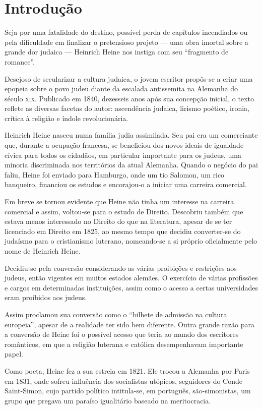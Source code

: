 \documentclass[12pt]{extarticle}
\begin{document}
\tableofcontents

\section{Introdução}

Seja por uma fatalidade do destino, possível perda de capítulos incendiados ou pela dificuldade em finalizar o pretensioso projeto --- uma obra imortal sobre a grande dor judaica --- Heinrich Heine nos instiga com seu ``fragmento de romance''.

Desejoso de secularizar a cultura judaica, o jovem escritor propôs-se a criar uma epopeia sobre o povo judeu diante da escalada antissemita na Alemanha do século \textsc{xix}.
Publicado em 1840, dezesseis anos após sua concepção inicial, o texto reflete as diversas facetas do autor:
ascendência judaica, lirismo poético, ironia, crítica à religião e índole revolucionária.

Heinrich Heine nasceu numa família judia assimilada. Seu pai era um comerciante que, durante a ocupação francesa, se beneficiou dos novos ideais de igualdade cívica para todos os cidadãos, em particular importante para os judeus, uma minoria discriminada nos territórios da atual Alemanha. 
Quando o negócio do pai faliu, Heine foi enviado para Hamburgo, onde um tio Salomon, um rico banqueiro, financiou os estudos e encorajou-o a iniciar uma carreira comercial.

Em breve se tornou evidente que Heine não tinha um interesse na carreira comercial e assim, voltou-se para o estudo de Direito. 
Descobriu também que estava menos interessado no Direito do que na literatura, apesar de se ter licenciado em Direito em 1825, ao mesmo tempo que decidiu converter-se do judaísmo para o cristianismo luterano, nomeando-se a si próprio oficialmente pelo nome de Heinrich Heine.

Decidiu-se pela conversão considerando as várias proibições e restrições aos judeus, então vigentes em muitos estados alemães. O exercício de várias profissões e cargos em determinadas instituições, assim como o acesso a certas universidades eram proibidos aos judeus. 

Assim proclamou sua conversão como o ``bilhete de admissão na cultura europeia'', apesar de a realidade ter sido bem diferente. Outra grande razão para a conversão de Heine foi o possível acesso que teria ao mundo dos escritores românticos, em que a religião luterana e católica desempenhavam importante papel.

Como poeta, Heine fez a sua estreia em 1821. Ele trocou a Alemanha por Paris em 1831, onde sofreu influência dos socialistas utópicos, seguidores do Conde Saint-Simon, cujo partido político intitula-se, em português, são-simonistas, um grupo que pregava um paraíso igualitário baseado na meritocracia.
\end{document}
